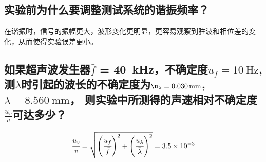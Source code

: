 \documentclass{../template/Report}
\begin{document}
\begin{fullreportonly}
	\subsection{实验前为什么要调整测试系统的谐振频率？}
	在谐振时，信号的振幅更大，波形变化更明显，更容易观察到驻波和相位差的变化，从而使得实验误差更小。
	\subsection{如果超声波发生器$\bar{f}$ = \SI{40}{\kilo\hertz}，不确定度$u_f = \SI{10}{\hertz}$, 测$\lambda$时引起的波长的不确定度为$\u_{\lambda} = \SI{0.030}{\mm}$, $\bar{\lambda} = \SI{8.560}{\mm}$， 则实验中所测得的声速相对不确定度$\frac{u_v}{v}$可达多少？}
	\begin{equation*}
		\cfrac{u_v}{v}  = \sqrt{\left(\cfrac{u_f}{\bar{f}}\right)^2 + \left(\cfrac{u_{\lambda}}{\bar{\lambda}}\right)^2} = 3.5 \times 10^{-3}
	\end{equation*}

\end{fullreportonly}

\insertnotes
\end{document}
